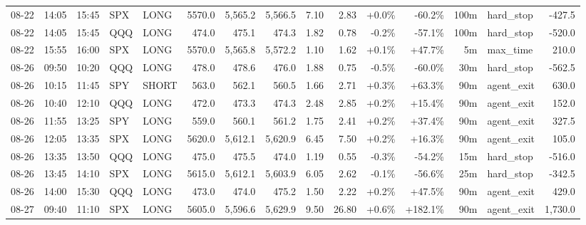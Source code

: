 \documentclass[11pt,a4paper,twoside]{article}
\begin{document}
\begin{landscape}
\begin{center}
\begin{longtable}{>{\color{txtmain}}l l l l l r r r r r r r r >{\color{txtmain}}l r}
08-22 & 14:05 & 15:45 & SPX & LONG & 5570.0 & 5,565.2 & 5,566.5 & 7.10 & 2.83 & \textcolor{wingreen}{+0.0\%} & \textcolor{lossred}{-60.2\%} & 100m & hard\_stop & \textcolor{lossred}{-427.5} \\
08-22 & 14:05 & 15:45 & QQQ & LONG & 474.0 & 475.1 & 474.3 & 1.82 & 0.78 & \textcolor{lossred}{-0.2\%} & \textcolor{lossred}{-57.1\%} & 100m & hard\_stop & \textcolor{lossred}{-520.0} \\
08-22 & 15:55 & 16:00 & SPX & LONG & 5570.0 & 5,565.8 & 5,572.2 & 1.10 & 1.62 & \textcolor{wingreen}{+0.1\%} & \textcolor{wingreen}{+47.7\%} & 5m & max\_time & \textcolor{wingreen}{210.0} \\
08-26 & 09:50 & 10:20 & QQQ & LONG & 478.0 & 478.6 & 476.0 & 1.88 & 0.75 & \textcolor{lossred}{-0.5\%} & \textcolor{lossred}{-60.0\%} & 30m & hard\_stop & \textcolor{lossred}{-562.5} \\
08-26 & 10:15 & 11:45 & SPY & SHORT & 563.0 & 562.1 & 560.5 & 1.66 & 2.71 & \textcolor{wingreen}{+0.3\%} & \textcolor{wingreen}{+63.3\%} & 90m & agent\_exit & \textcolor{wingreen}{630.0} \\
08-26 & 10:40 & 12:10 & QQQ & LONG & 472.0 & 473.3 & 474.3 & 2.48 & 2.85 & \textcolor{wingreen}{+0.2\%} & \textcolor{wingreen}{+15.4\%} & 90m & agent\_exit & \textcolor{wingreen}{152.0} \\
08-26 & 11:55 & 13:25 & SPY & LONG & 559.0 & 560.1 & 561.2 & 1.75 & 2.41 & \textcolor{wingreen}{+0.2\%} & \textcolor{wingreen}{+37.4\%} & 90m & agent\_exit & \textcolor{wingreen}{327.5} \\
08-26 & 12:05 & 13:35 & SPX & LONG & 5620.0 & 5,612.1 & 5,620.9 & 6.45 & 7.50 & \textcolor{wingreen}{+0.2\%} & \textcolor{wingreen}{+16.3\%} & 90m & agent\_exit & \textcolor{wingreen}{105.0} \\
08-26 & 13:35 & 13:50 & QQQ & LONG & 475.0 & 475.5 & 474.0 & 1.19 & 0.55 & \textcolor{lossred}{-0.3\%} & \textcolor{lossred}{-54.2\%} & 15m & hard\_stop & \textcolor{lossred}{-516.0} \\
08-26 & 13:45 & 14:10 & SPX & LONG & 5615.0 & 5,612.1 & 5,603.9 & 6.05 & 2.62 & \textcolor{lossred}{-0.1\%} & \textcolor{lossred}{-56.6\%} & 25m & hard\_stop & \textcolor{lossred}{-342.5} \\
08-26 & 14:00 & 15:30 & QQQ & LONG & 473.0 & 474.0 & 475.2 & 1.50 & 2.22 & \textcolor{wingreen}{+0.2\%} & \textcolor{wingreen}{+47.5\%} & 90m & agent\_exit & \textcolor{wingreen}{429.0} \\
08-27 & 09:40 & 11:10 & SPX & LONG & 5605.0 & 5,596.6 & 5,629.9 & 9.50 & 26.80 & \textcolor{wingreen}{+0.6\%} & \textcolor{wingreen}{+182.1\%} & 90m & agent\_exit & \textcolor{wingreen}{1,730.0} \\

\end{longtable}
\end{center}
\end{landscape}
\end{document}
